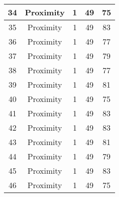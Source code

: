 \documentclass[results.tex]{subfiles}
\begin{document}
\begin{center}
\begin{tabular}{| c || c | c | c | c |}
            \hline
            34                      & Proximity                    & 1                      & 49                      & 75                   \\
            \hline
            35                      & Proximity                    & 1                      & 49                      & 83                   \\
            \hline
            36                      & Proximity                    & 1                      & 49                      & 77                   \\
            \hline
            37                      & Proximity                    & 1                      & 49                      & 79                   \\
            \hline
            38                      & Proximity                    & 1                      & 49                      & 77                   \\
            \hline
            39                      & Proximity                    & 1                      & 49                      & 81                   \\
            \hline
            40                      & Proximity                    & 1                      & 49                      & 75                   \\
            \hline
            41                      & Proximity                    & 1                      & 49                      & 83                   \\
            \hline
            42                      & Proximity                    & 1                      & 49                      & 83                   \\
            \hline
            43                      & Proximity                    & 1                      & 49                      & 81                   \\
            \hline
            44                      & Proximity                    & 1                      & 49                      & 79                   \\
            \hline
            45                      & Proximity                    & 1                      & 49                      & 83                   \\
            \hline
            46                      & Proximity                    & 1                      & 49                      & 75                   \\

\end{tabular}
\end{center}
\end{document}
